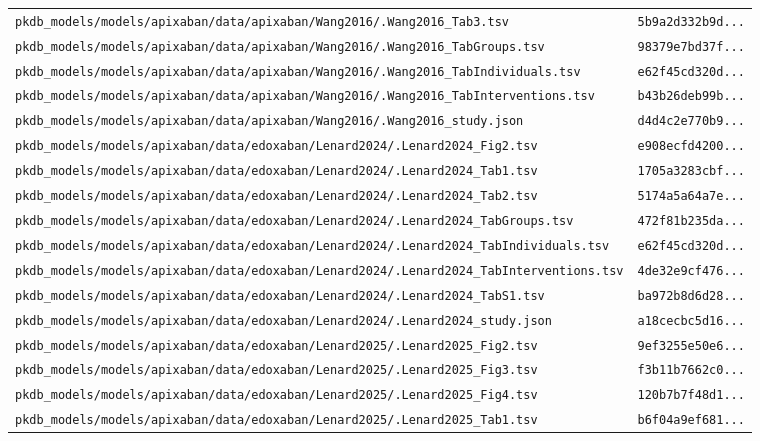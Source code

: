 \documentclass{article}
\begin{document}
\begin{longtable}{ll}
\texttt{pkdb\_models/models/apixaban/data/apixaban/Wang2016/.Wang2016\_Tab3.tsv} & \texttt{5b9a2d332b9d...} \\
\texttt{pkdb\_models/models/apixaban/data/apixaban/Wang2016/.Wang2016\_TabGroups.tsv} & \texttt{98379e7bd37f...} \\
\texttt{pkdb\_models/models/apixaban/data/apixaban/Wang2016/.Wang2016\_TabIndividuals.tsv} & \texttt{e62f45cd320d...} \\
\texttt{pkdb\_models/models/apixaban/data/apixaban/Wang2016/.Wang2016\_TabInterventions.tsv} & \texttt{b43b26deb99b...} \\
\texttt{pkdb\_models/models/apixaban/data/apixaban/Wang2016/.Wang2016\_study.json} & \texttt{d4d4c2e770b9...} \\
\texttt{pkdb\_models/models/apixaban/data/edoxaban/Lenard2024/.Lenard2024\_Fig2.tsv} & \texttt{e908ecfd4200...} \\
\texttt{pkdb\_models/models/apixaban/data/edoxaban/Lenard2024/.Lenard2024\_Tab1.tsv} & \texttt{1705a3283cbf...} \\
\texttt{pkdb\_models/models/apixaban/data/edoxaban/Lenard2024/.Lenard2024\_Tab2.tsv} & \texttt{5174a5a64a7e...} \\
\texttt{pkdb\_models/models/apixaban/data/edoxaban/Lenard2024/.Lenard2024\_TabGroups.tsv} & \texttt{472f81b235da...} \\
\texttt{pkdb\_models/models/apixaban/data/edoxaban/Lenard2024/.Lenard2024\_TabIndividuals.tsv} & \texttt{e62f45cd320d...} \\
\texttt{pkdb\_models/models/apixaban/data/edoxaban/Lenard2024/.Lenard2024\_TabInterventions.tsv} & \texttt{4de32e9cf476...} \\
\texttt{pkdb\_models/models/apixaban/data/edoxaban/Lenard2024/.Lenard2024\_TabS1.tsv} & \texttt{ba972b8d6d28...} \\
\texttt{pkdb\_models/models/apixaban/data/edoxaban/Lenard2024/.Lenard2024\_study.json} & \texttt{a18cecbc5d16...} \\
\texttt{pkdb\_models/models/apixaban/data/edoxaban/Lenard2025/.Lenard2025\_Fig2.tsv} & \texttt{9ef3255e50e6...} \\
\texttt{pkdb\_models/models/apixaban/data/edoxaban/Lenard2025/.Lenard2025\_Fig3.tsv} & \texttt{f3b11b7662c0...} \\
\texttt{pkdb\_models/models/apixaban/data/edoxaban/Lenard2025/.Lenard2025\_Fig4.tsv} & \texttt{120b7b7f48d1...} \\
\texttt{pkdb\_models/models/apixaban/data/edoxaban/Lenard2025/.Lenard2025\_Tab1.tsv} & \texttt{b6f04a9ef681...} \\

\end{longtable}
\end{document}
